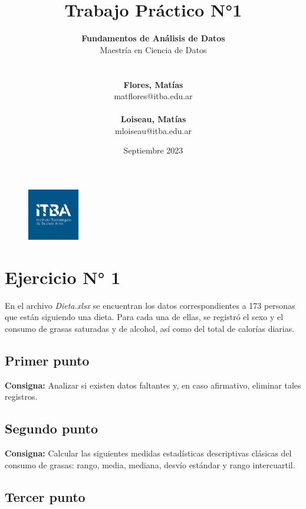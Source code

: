 \documentclass{article} %
\title{Trabajo Práctico N°1} %
\date{Septiembre 2023} %
\author{
	\textbf{Fundamentos de Análisis de Datos}\\
	Maestría en Ciencia de Datos\\
	\\~\\
	\textbf{Flores, Matías}\\
	matflores@itba.edu.ar
 	\\~\\
 	\textbf{Loiseau, Matías}\\
 	mloiseau@itba.edu.ar
}
\begin{document}

\begin{figure}
\centering
	\includegraphics[width=0.2\textwidth]{images/itba-logo}
	\label{fig:itba-logo}
\end{figure}
\maketitle %

\thispagestyle{empty} %
\cleardoublepage

\cleardoublepage
\tableofcontents %
\cleardoublepage

\section{Ejercicio N° 1}
En el archivo \textit{Dieta.xlsx} se encuentran los datos correspondientes a 173 personas que están siguiendo una dieta. Para cada una de ellas, se registró el sexo y el consumo de grasas saturadas y de alcohol, así como del total de calorías diarias.

\subsection{Primer punto}

\textbf{Consigna:} Analizar si existen datos faltantes y, en caso afirmativo, eliminar tales registros.



\subsection{Segundo punto}

\textbf{Consigna:} Calcular las siguientes medidas estadísticas descriptivas clásicas del consumo de grasas: rango, media, mediana, desvío estándar y rango intercuartil.


\subsection{Tercer punto}
\end{document}
